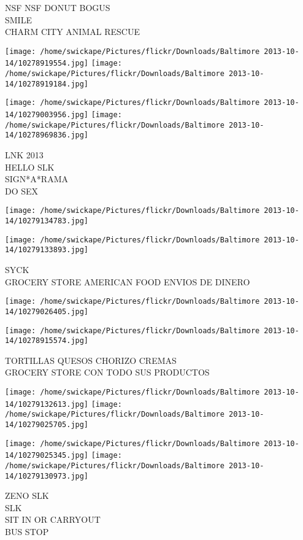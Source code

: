 \documentclass[10pt,letterpaper]{article}
\begin{document}
NSF NSF DONUT BOGUS\\
SMILE\\
CHARM CITY ANIMAL RESCUE
\pagebreak

\texttt{[image: /home/swickape/Pictures/flickr/Downloads/Baltimore 2013-10-14/10278919554.jpg]}
\texttt{[image: /home/swickape/Pictures/flickr/Downloads/Baltimore 2013-10-14/10278919184.jpg]}

\texttt{[image: /home/swickape/Pictures/flickr/Downloads/Baltimore 2013-10-14/10279003956.jpg]}
\texttt{[image: /home/swickape/Pictures/flickr/Downloads/Baltimore 2013-10-14/10278969836.jpg]}

LNK 2013\\
HELLO SLK\\
SIGN*A*RAMA\\
DO SEX
\pagebreak

\texttt{[image: /home/swickape/Pictures/flickr/Downloads/Baltimore 2013-10-14/10279134783.jpg]}

\vspace{0.25in}
\texttt{[image: /home/swickape/Pictures/flickr/Downloads/Baltimore 2013-10-14/10279133893.jpg]}

SYCK\\
GROCERY STORE AMERICAN FOOD ENVIOS DE DINERO
\pagebreak

\texttt{[image: /home/swickape/Pictures/flickr/Downloads/Baltimore 2013-10-14/10279026405.jpg]}

\vspace{0.25in}
\texttt{[image: /home/swickape/Pictures/flickr/Downloads/Baltimore 2013-10-14/10278915574.jpg]}

TORTILLAS QUESOS CHORIZO CREMAS\\
GROCERY STORE CON TODO SUS PRODUCTOS
\pagebreak

\texttt{[image: /home/swickape/Pictures/flickr/Downloads/Baltimore 2013-10-14/10279132613.jpg]}
\texttt{[image: /home/swickape/Pictures/flickr/Downloads/Baltimore 2013-10-14/10279025705.jpg]}

\texttt{[image: /home/swickape/Pictures/flickr/Downloads/Baltimore 2013-10-14/10279025345.jpg]}
\texttt{[image: /home/swickape/Pictures/flickr/Downloads/Baltimore 2013-10-14/10279130973.jpg]}

ZENO SLK\\
SLK\\
SIT IN OR CARRYOUT\\
BUS STOP
\pagebreak
\end{document}
